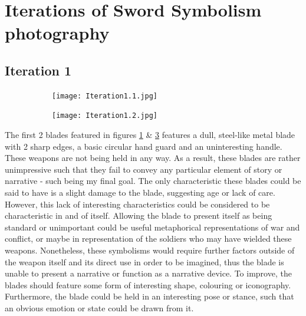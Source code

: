 \documentclass{article}
\begin{document}
\pagebreak

\section{Iterations of Sword Symbolism photography}

\subsection{Iteration 1} \label{Iteration1}

\begin{figure}[h]
    \centering
    \caption{}
    \label{fig:Iteration1}
    \begin{subfigure}{0.3\textwidth}
        \texttt{[image: Iteration1.1.jpg]}
        \caption{}
        \label{fig:Iteration1.1}
    \end{subfigure}
    \begin{subfigure}{0.3\textwidth}
        \texttt{[image: Iteration1.2.jpg]}
        \caption{}
        \label{fig:Iteration1.2}
    \end{subfigure}
\end{figure}

The first 2 blades featured in figures \ref{fig:Iteration1.1} & \ref{fig:Iteration1.2} features a dull, steel-like metal blade with 2 sharp edges, a basic circular hand guard and an uninteresting handle. These weapons are not being held in any way. As a result, these blades are rather unimpressive such that they fail to convey any particular element of story or narrative - such being my final goal. The only characteristic these blades could be said to have is a slight damage to the blade, suggesting age or lack of care. However, this lack of interesting characteristics could be considered to be characteristic in and of itself. Allowing the blade to present itself as being standard or unimportant could be useful metaphorical representations of war and conflict, or maybe in representation of the soldiers who may have wielded these weapons. Nonetheless, these symbolisms would require further factors outside of the weapon itself and its direct use in order to be imagined, thus the blade is unable to present a narrative or function as a narrative device. To improve, the blades should feature some form of interesting shape, colouring or iconography. Furthermore, the blade could be held in an interesting pose or stance, such that an obvious emotion or state could be drawn from it.

\pagebreak
\end{document}
